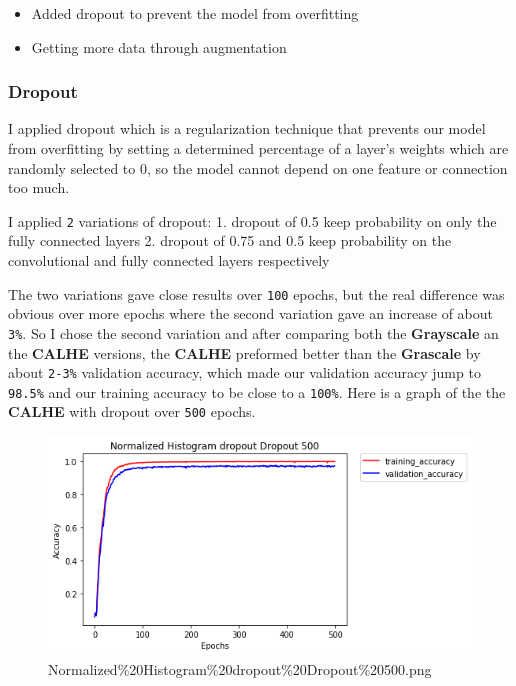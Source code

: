 \documentclass[11pt]{article}
\makeatletter
\def\maxwidth{\ifdim\Gin@nat@width>\linewidth\linewidth
    \else\Gin@nat@width\fi}
\let\Oldincludegraphics\includegraphics
\renewcommand{\includegraphics}[1]{\Oldincludegraphics[width=.8\maxwidth]{#1}}
\providecommand{\tightlist}{%
      \setlength{\itemsep}{0pt}\setlength{\parskip}{0pt}}
\makeatother
\begin{document}
\begin{itemize}
\tightlist
\item
  Added dropout to prevent the model from overfitting
\item
  Getting more data through augmentation
\end{itemize}

\hypertarget{dropout}{%
\subsubsection{Dropout}\label{dropout}}

I applied dropout which is a regularization technique that prevents our
model from overfitting by setting a determined percentage of a layer's
weights which are randomly selected to 0, so the model cannot depend on
one feature or connection too much.

I applied \texttt{2} variations of dropout: 1. dropout of 0.5 keep
probability on only the fully connected layers 2. dropout of 0.75 and
0.5 keep probability on the convolutional and fully connected layers
respectively

The two variations gave close results over \texttt{100} epochs, but the
real difference was obvious over more epochs where the second variation
gave an increase of about \texttt{3\%}. So I chose the second variation
and after comparing both the \textbf{Grayscale} an the \textbf{CALHE}
versions, the \textbf{CALHE} preformed better than the \textbf{Grascale}
by about \texttt{2-3\%} validation accuracy, which made our validation
accuracy jump to \texttt{98.5\%} and our training accuracy to be close
to a \texttt{100\%}. Here is a graph of the the \textbf{CALHE} with
dropout over \texttt{500} epochs.

\begin{figure}
\centering
\includegraphics{./accuracies/finaltests/Normalized Histogram dropout Dropout 500.png}
\caption{Normalized\%20Histogram\%20dropout\%20Dropout\%20500.png}
\end{figure}
\end{document}
